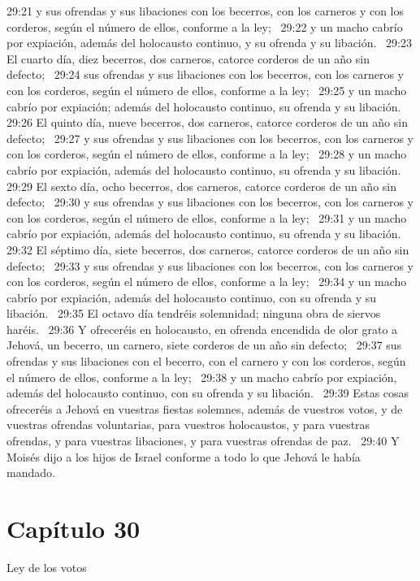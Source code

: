29:21 y sus ofrendas y sus libaciones con los becerros, con los carneros y con los corderos, según el número de ellos, conforme a la ley;  
29:22 y un macho cabrío por expiación, además del holocausto continuo, y su ofrenda y su libación.  
29:23 El cuarto día, diez becerros, dos carneros, catorce corderos de un año sin defecto;  
29:24 sus ofrendas y sus libaciones con los becerros, con los carneros y con los corderos, según el número de ellos, conforme a la ley;  
29:25 y un macho cabrío por expiación; además del holocausto continuo, su ofrenda y su libación.  
29:26 El quinto día, nueve becerros, dos carneros, catorce corderos de un año sin defecto;  
29:27 y sus ofrendas y sus libaciones con los becerros, con los carneros y con los corderos, según el número de ellos, conforme a la ley;  
29:28 y un macho cabrío por expiación, además del holocausto continuo, su ofrenda y su libación.  
29:29 El sexto día, ocho becerros, dos carneros, catorce corderos de un año sin defecto;  
29:30 y sus ofrendas y sus libaciones con los becerros, con los carneros y con los corderos, según el número de ellos, conforme a la ley;  
29:31 y un macho cabrío por expiación, además del holocausto continuo, su ofrenda y su libación.  
29:32 El séptimo día, siete becerros, dos carneros, catorce corderos de un año sin defecto;  
29:33 y sus ofrendas y sus libaciones con los becerros, con los carneros y con los corderos, según el número de ellos, conforme a la ley;  
29:34 y un macho cabrío por expiación, además del holocausto continuo, con su ofrenda y su libación.  
29:35 El octavo día tendréis solemnidad; ninguna obra de siervos haréis.  
29:36 Y ofreceréis en holocausto, en ofrenda encendida de olor grato a Jehová, un becerro, un carnero, siete corderos de un año sin defecto;  
29:37 sus ofrendas y sus libaciones con el becerro, con el carnero y con los corderos, según el número de ellos, conforme a la ley;  
29:38 y un macho cabrío por expiación, además del holocausto continuo, con su ofrenda y su libación.  
29:39 Estas cosas ofreceréis a Jehová en vuestras fiestas solemnes, además de vuestros votos, y de vuestras ofrendas voluntarias, para vuestros holocaustos, y para vuestras ofrendas, y para vuestras libaciones, y para vuestras ofrendas de paz.  
29:40 Y Moisés dijo a los hijos de Israel conforme a todo lo que Jehová le había mandado.  
\section*{Capítulo 30 }
Ley de los votos  

